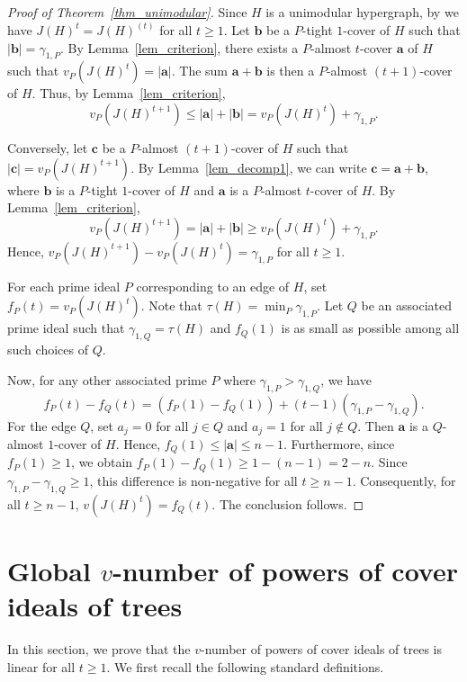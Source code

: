 \documentclass[12pt,amscd]{amsart}
\theoremstyle{definition}
\numberwithin{equation}{section}
\begin{document}
\begin{proof}[Proof of Theorem~\ref{thm_unimodular}]
Since $H$ is a unimodular hypergraph, by \cite{HHT} we have $J(H)^t = J(H)^{(t)}$ for all $t \ge 1$. Let $\mathbf{b}$ be a $P$-tight $1$-cover of $H$ such that $|\mathbf{b}| = \gamma_{1,P}$. By Lemma~\ref{lem_criterion}, there exists a $P$-almost $t$-cover $\mathbf{a}$ of $H$ such that $v_P(J(H)^t) = |\mathbf{a}|$. The sum $\mathbf{a} + \mathbf{b}$ is then a $P$-almost $(t+1)$-cover of $H$. Thus, by Lemma~\ref{lem_criterion},
\[
v_P(J(H)^{t+1}) \le |\mathbf{a}| + |\mathbf{b}| = v_P(J(H)^t) + \gamma_{1,P}.
\]

Conversely, let $\mathbf{c}$ be a $P$-almost $(t+1)$-cover of $H$ such that $|\mathbf{c}| = v_P(J(H)^{t+1})$. By Lemma~\ref{lem_decomp1}, we can write $\mathbf{c} = \mathbf{a} + \mathbf{b}$, where $\mathbf{b}$ is a $P$-tight $1$-cover of $H$ and $\mathbf{a}$ is a $P$-almost $t$-cover of $H$. By Lemma~\ref{lem_criterion},
\[
v_P(J(H)^{t+1}) = |\mathbf{a}| + |\mathbf{b}| \ge v_P(J(H)^t) + \gamma_{1,P}.
\]
Hence, $v_P(J(H)^{t+1}) - v_P(J(H)^t) = \gamma_{1,P}$ for all $t \ge 1$.

For each prime ideal $P$ corresponding to an edge of $H$, set $f_P(t) = v_P(J(H)^t)$. Note that $\tau(H) = \min_{P} \gamma_{1,P}$. Let $Q$ be an associated prime ideal such that $\gamma_{1,Q} = \tau(H)$ and $f_Q(1)$ is as small as possible among all such choices of $Q$.

Now, for any other associated prime $P$ where $\gamma_{1,P} > \gamma_{1,Q}$, we have
\[
f_P(t) - f_Q(t) = (f_P(1) - f_Q(1)) + (t-1)(\gamma_{1,P} - \gamma_{1,Q}).
\]
For the edge $Q$, set $a_j = 0$ for all $j \in Q$ and $a_j = 1$ for all $j \notin Q$. Then $\mathbf{a}$ is a $Q$-almost $1$-cover of $H$. Hence, $f_Q(1) \le |\mathbf{a}| \le n-1$. Furthermore, since $f_P(1) \ge 1$, we obtain $f_P(1) - f_Q(1) \ge 1 - (n-1) = 2 - n$. Since $\gamma_{1,P} - \gamma_{1,Q} \ge 1$, this difference is non-negative for all $t \ge n-1$. Consequently, for all $t \ge n-1$, $v(J(H)^t) = f_Q(t)$. The conclusion follows.
\end{proof}


\section{Global $v$-number of powers of cover ideals of trees}
In this section, we prove that the $v$-number of powers of cover ideals of trees is linear for all $t \ge 1$. We first recall the following standard definitions.
\end{document}
